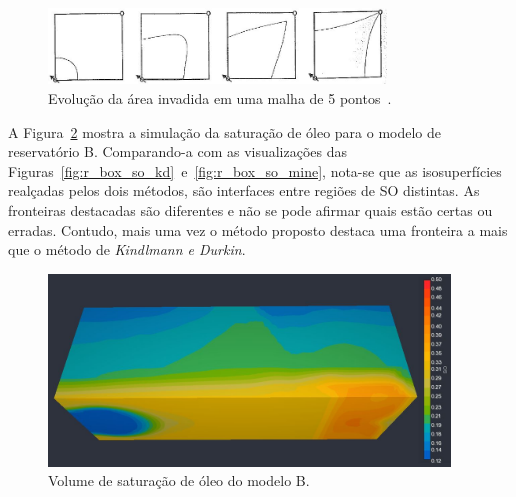 \begin{figure}[h]
	\centering
	\includegraphics[width=0.8\textwidth]{images/reserv_livro}
	\caption{Evolução da área invadida em uma malha de 5 pontos~\cite{rosa}.}
	\label{fig:r_reserv_livro}
\end{figure}
	
\newpage
	A Figura~\ref{fig:r_box_so_slice} mostra a simulação da saturação de óleo para o modelo de reservatório B. Comparando-a com as visualizações das Figuras~\ref{fig:r_box_so_kd}~e~\ref{fig:r_box_so_mine}, nota-se que as isosuperfícies realçadas pelos dois métodos, são interfaces entre regiões de SO distintas. As fronteiras destacadas são diferentes e não se pode afirmar quais estão certas ou erradas. Contudo, mais uma vez o método proposto destaca uma fronteira a mais que o método de \textit{Kindlmann e Durkin}.

\begin{figure}[h]
	\centering
	\includegraphics[width=0.95\textwidth]{images/r_box_so_slice}
	\caption{Volume de saturação de óleo do modelo B.}
	\label{fig:r_box_so_slice}
\end{figure}

